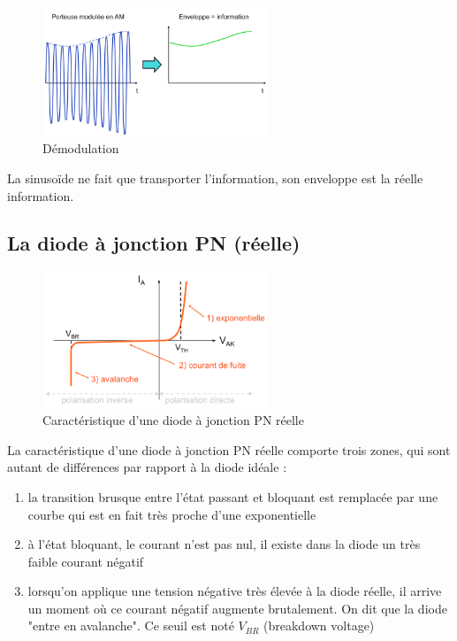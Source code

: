 \documentclass[a4paper]{article}
\begin{document}
    \begin{figure}[H]
        \begin{center}
            \includegraphics[width=0.6\textwidth]{fig/5_demod.png}
            \caption{Démodulation}
            \label{fig:5_demod}
        \end{center}
    \end{figure}

    La sinusoïde ne fait que transporter l'information, son enveloppe est la
    réelle information.

    \subsection{La diode à jonction PN (réelle)}
    \begin{figure}[H]
        \begin{center}
            \includegraphics[width=0.6\textwidth]{fig/5_dioderelle.png}
            \caption{Caractéristique d'une diode à jonction PN réelle}
            \label{fig:5_dioderelle}
        \end{center}
    \end{figure}
    La caractéristique d'une diode à jonction PN réelle comporte trois zones, qui
    sont autant de différences par rapport à la diode idéale :
    \begin{enumerate}
        \item la transition brusque entre l'état passant et bloquant est remplacée
        par une courbe qui est en fait très proche d'une exponentielle
        \item à l'état bloquant, le courant n'est pas nul, il existe dans la diode
        un très faible courant négatif
        \item lorsqu'on applique une tension négative très élevée à la diode réelle,
        il arrive un moment où ce courant négatif augmente brutalement. On dit que
        la diode "entre en avalanche". Ce seuil est noté $V_{BR}$ (breakdown voltage)
    \end{enumerate}
\end{document}
